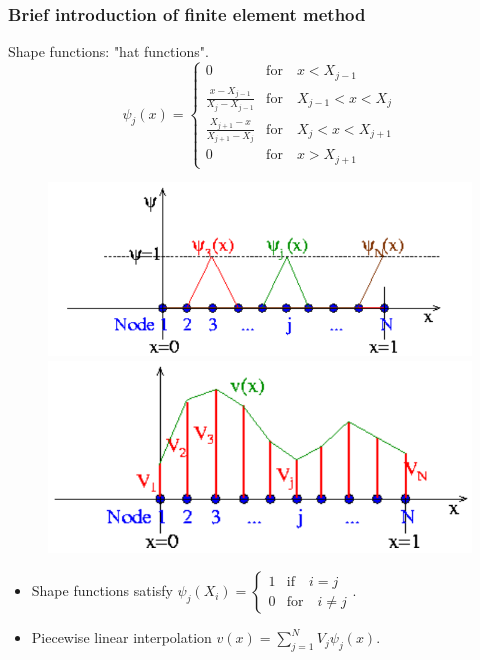 \documentclass{beamer}
\newcommand{\bi}{\begin{itemize}}
\newcommand{\ei}{\end{itemize}}
\begin{document}
	
	
	
	\begin{frame}
		\frametitle{Brief introduction of finite element method}
		\begin{overlayarea}{\textwidth}{\textheight}
			\vspace{-0.2cm}\small	Shape functions: "hat functions".
			$$\psi_j(x)=
			\begin{cases}
				0 & \text{for}\quad x<X_{j-1} \\
				\frac{x-X_{j-1}}{X_{j}-X_{j-1}} & \text{for}\quad X_{j-1}<x<X_{j}\\
				\frac{X_{j+1}-x}{X_{j+1}-X_{j}} & \text{for}\quad X_{j}<x<X_{j+1} \\
				0 & \text{for}\quad x>X_{j+1}
			\end{cases}$$\vspace{-0.6cm}
			\begin{figure}[htb]
				\begin{minipage}[t]{0.49\linewidth}
					\centering
					\includegraphics[scale=0.22]{plots/finite1.png}
				\end{minipage}
				\begin{minipage}[t]{0.49\linewidth}
					\centering
					\includegraphics[scale=0.22]{plots/finite2.png}
				\end{minipage}
			\end{figure}\vspace{-0.2cm}
			\bi
			\item Shape functions satisfy $\psi_j(X_i)=
			\begin{cases}
				1 & \text{if}\quad i=j \\
				0 & \text{for}\quad i\neq j
			\end{cases}.$
			\item Piecewise linear interpolation $v(x)=\sum^N_{j=1} V_j \psi_j(x)$.
			\ei
		\end{overlayarea}
	\end{frame}
	
\end{document}
